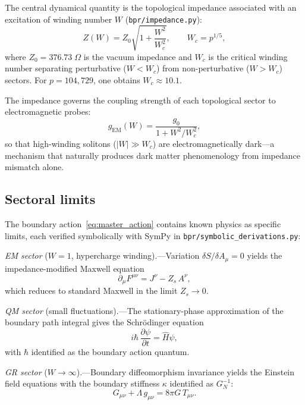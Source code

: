 \documentclass[aps,prd,twocolumn,superscriptaddress,longbibliography,nofootinbib]{revtex4-2}
\newcommand{\Wc}{W_{\!c}}
\newcommand{\Zimp}{Z}
\newcommand{\Zvac}{Z_0}
\begin{document}
The central dynamical quantity is the topological impedance
associated with an excitation of winding number $W$
(\texttt{bpr/impedance.py}):
\begin{equation}
\Zimp(W) = \Zvac \sqrt{1 + \frac{W^2}{\Wc^2}},
\qquad \Wc = p^{1/5},
\label{eq:impedance}
\end{equation}
where $\Zvac = 376.73\;\Omega$ is the vacuum impedance and
$\Wc$ is the critical winding number separating perturbative
($W < \Wc$) from non-perturbative ($W > \Wc$) sectors.  For
$p = 104{,}729$, one obtains $\Wc \approx 10.1$.

The impedance governs the coupling strength of each topological
sector to electromagnetic probes:
\begin{equation}
g_{\mathrm{EM}}(W) = \frac{g_0}{1 + W^2/\Wc^2},
\label{eq:em_coupling}
\end{equation}
so that high-winding solitons ($|W| \gg \Wc$) are
electromagnetically dark---a mechanism that naturally produces dark
matter phenomenology from impedance mismatch alone.

\subsection{Sectoral limits}

The boundary action~\eqref{eq:master_action} contains known physics
as specific limits, each verified symbolically with SymPy in
\texttt{bpr/symbolic\_derivations.py}:

\textit{EM sector} ($W = 1$, hypercharge winding).---Variation
$\delta S / \delta A_\mu = 0$ yields the impedance-modified Maxwell
equation
\begin{equation}
\partial_\mu F^{\mu\nu} = J^\nu - Z_s\, A^\nu,
\label{eq:maxwell}
\end{equation}
which reduces to standard Maxwell in the limit $Z_s \to 0$.

\textit{QM sector} (small fluctuations).---The stationary-phase
approximation of the boundary path integral gives the Schr\"odinger
equation
\begin{equation}
i\hbar\, \frac{\partial\psi}{\partial t} = \hat{H}\psi,
\label{eq:schrodinger}
\end{equation}
with $\hbar$ identified as the boundary action quantum.

\textit{GR sector} ($W \to \infty$).---Boundary diffeomorphism
invariance yields the Einstein field equations with the boundary
stiffness $\kappa$ identified as $G_N^{-1}$:
\begin{equation}
G_{\mu\nu} + \Lambda\, g_{\mu\nu} = 8\pi G\, T_{\mu\nu}.
\label{eq:einstein}
\end{equation}
\end{document}
